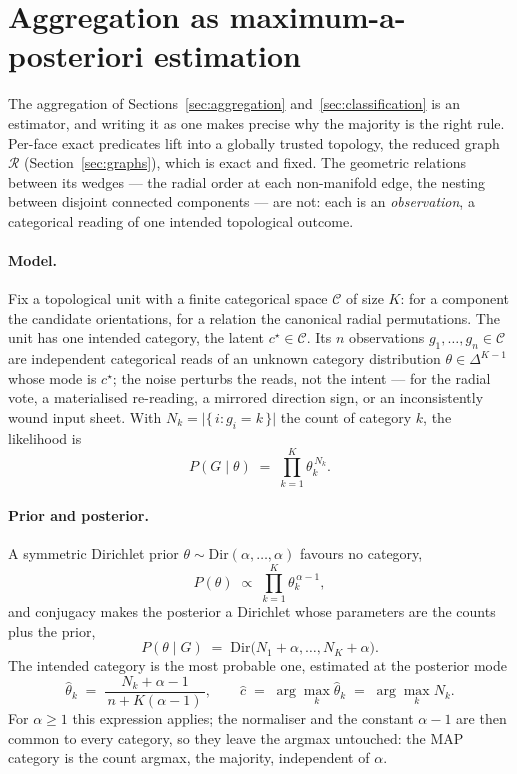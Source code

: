 \documentclass{egpubl}
\begin{document}
\appendix
\section{Aggregation as maximum-a-posteriori estimation}
\label{app:bayesian}

The aggregation of Sections~\ref{sec:aggregation} and~\ref{sec:classification} is an estimator, and writing it as one makes precise why the majority is the right rule. Per-face exact predicates lift into a globally trusted topology, the reduced graph $\mathcal{R}$ (Section~\ref{sec:graphs}), which is exact and fixed. The geometric relations between its wedges --- the radial order at each non-manifold edge, the nesting between disjoint connected components --- are not: each is an \emph{observation}, a categorical reading of one intended topological outcome.

\paragraph*{Model.} Fix a topological unit with a finite categorical space $\mathcal{C}$ of size $K$: for a component the candidate orientations, for a relation the canonical radial permutations. The unit has one intended category, the latent $c^\star \in \mathcal{C}$. Its $n$ observations $g_1, \dots, g_n \in \mathcal{C}$ are independent categorical reads of an unknown category distribution $\theta \in \Delta^{K-1}$ whose mode is $c^\star$; the noise perturbs the reads, not the intent --- for the radial vote, a materialised re-reading, a mirrored direction sign, or an inconsistently wound input sheet. With $N_k = \lvert\{\, i : g_i = k \,\}\rvert$ the count of category $k$, the likelihood is
\begin{equation}
  P(G \mid \theta) \;=\; \prod_{k=1}^{K} \theta_k^{\,N_k}.
\end{equation}

\paragraph*{Prior and posterior.} A symmetric Dirichlet prior $\theta \sim \mathrm{Dir}(\alpha, \dots, \alpha)$ favours no category,
\begin{equation}
  P(\theta) \;\propto\; \prod_{k=1}^{K} \theta_k^{\,\alpha - 1},
\end{equation}
and conjugacy makes the posterior a Dirichlet whose parameters are the counts plus the prior,
\begin{equation}
  P(\theta \mid G) \;=\; \mathrm{Dir}\!\bigl(N_1 + \alpha, \dots, N_K + \alpha\bigr).
\end{equation}
The intended category is the most probable one, estimated at the posterior mode
\begin{equation}
  \hat\theta_k \;=\; \frac{N_k + \alpha - 1}{\,n + K(\alpha - 1)\,},
  \qquad
  \hat c \;=\; \arg\max_k \hat\theta_k \;=\; \arg\max_k N_k .
\end{equation}
For $\alpha \ge 1$ this expression applies; the normaliser and the constant $\alpha - 1$ are then common to every category, so they leave the argmax untouched: the MAP category is the count argmax, the majority, independent of $\alpha$.
\end{document}

